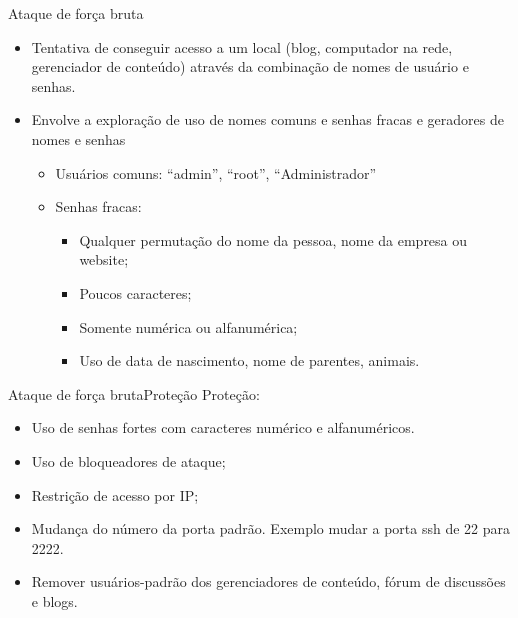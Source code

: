   
  \begin{frame}{Ataque de força bruta}
    \begin{itemize}[<+->]
    \item    Tentativa de conseguir acesso a um local (blog, computador na rede, gerenciador de conteúdo) através da combinação de nomes de usuário e senhas.
    \item Envolve a exploração de uso de nomes comuns e senhas fracas e geradores de nomes e senhas
      \begin{itemize}
      \item Usuários comuns: ``admin'', ``root'', ``Administrador''
      \item Senhas fracas:
        \begin{itemize}
        \item Qualquer permutação do nome da pessoa, nome da empresa ou website;
        \item Poucos caracteres;
        \item Somente numérica ou alfanumérica;
        \item Uso de data de nascimento,  nome de parentes, animais.
        \end{itemize}
      \end{itemize}
    \end{itemize}
  \end{frame}

  \begin{frame}{Ataque de força bruta}{Proteção}
    Proteção:\\
    \begin{itemize}[<+->]
    \item Uso de senhas fortes com caracteres numérico e alfanuméricos.
    \item Uso de bloqueadores de ataque;
    \item Restrição de acesso por IP;
    \item Mudança do número da porta padrão. Exemplo mudar a porta ssh de 22 para 2222.
    \item Remover usuários-padrão dos gerenciadores de conteúdo, fórum de discussões e blogs.
    \end{itemize}
  \end{frame}

  